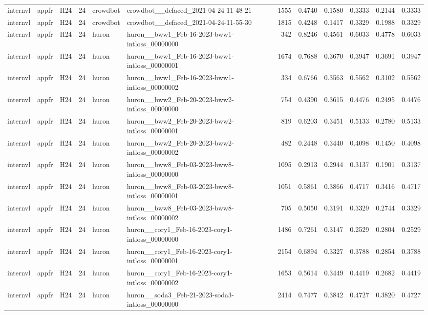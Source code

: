 \begin{table}[tbp]
\begin{tabular}{lllrllrrrrrr}
internvl & appfr & H24 & 24 & crowdbot & crowdbot\_\_defaced\_2021-04-24-11-48-21 & 1555 & 0.4740 & 0.1580 & 0.3333 & 0.2144 & 0.3333 \\
internvl & appfr & H24 & 24 & crowdbot & crowdbot\_\_defaced\_2021-04-24-11-55-30 & 1815 & 0.4248 & 0.1417 & 0.3329 & 0.1988 & 0.3329 \\
internvl & appfr & H24 & 24 & huron & huron\_\_bww1\_Feb-16-2023-bww1-intloss\_00000000 & 342 & 0.8246 & 0.4561 & 0.6033 & 0.4778 & 0.6033 \\
internvl & appfr & H24 & 24 & huron & huron\_\_bww1\_Feb-16-2023-bww1-intloss\_00000001 & 1674 & 0.7688 & 0.3670 & 0.3947 & 0.3691 & 0.3947 \\
internvl & appfr & H24 & 24 & huron & huron\_\_bww1\_Feb-16-2023-bww1-intloss\_00000002 & 334 & 0.6766 & 0.3563 & 0.5562 & 0.3102 & 0.5562 \\
internvl & appfr & H24 & 24 & huron & huron\_\_bww2\_Feb-20-2023-bww2-intloss\_00000000 & 754 & 0.4390 & 0.3615 & 0.4476 & 0.2495 & 0.4476 \\
internvl & appfr & H24 & 24 & huron & huron\_\_bww2\_Feb-20-2023-bww2-intloss\_00000001 & 819 & 0.6203 & 0.3451 & 0.5133 & 0.2780 & 0.5133 \\
internvl & appfr & H24 & 24 & huron & huron\_\_bww2\_Feb-20-2023-bww2-intloss\_00000002 & 482 & 0.2448 & 0.3440 & 0.4098 & 0.1450 & 0.4098 \\
internvl & appfr & H24 & 24 & huron & huron\_\_bww8\_Feb-03-2023-bww8-intloss\_00000000 & 1095 & 0.2913 & 0.2944 & 0.3137 & 0.1901 & 0.3137 \\
internvl & appfr & H24 & 24 & huron & huron\_\_bww8\_Feb-03-2023-bww8-intloss\_00000001 & 1051 & 0.5861 & 0.3866 & 0.4717 & 0.3416 & 0.4717 \\
internvl & appfr & H24 & 24 & huron & huron\_\_bww8\_Feb-03-2023-bww8-intloss\_00000002 & 705 & 0.5050 & 0.3191 & 0.3329 & 0.2744 & 0.3329 \\
internvl & appfr & H24 & 24 & huron & huron\_\_cory1\_Feb-16-2023-cory1-intloss\_00000000 & 1486 & 0.7261 & 0.3147 & 0.2529 & 0.2804 & 0.2529 \\
internvl & appfr & H24 & 24 & huron & huron\_\_cory1\_Feb-16-2023-cory1-intloss\_00000001 & 2154 & 0.6894 & 0.3327 & 0.3788 & 0.2854 & 0.3788 \\
internvl & appfr & H24 & 24 & huron & huron\_\_cory1\_Feb-16-2023-cory1-intloss\_00000002 & 1653 & 0.5614 & 0.3449 & 0.4419 & 0.2682 & 0.4419 \\
internvl & appfr & H24 & 24 & huron & huron\_\_soda3\_Feb-21-2023-soda3-intloss\_00000000 & 2414 & 0.7477 & 0.3842 & 0.4727 & 0.3820 & 0.4727 \\

\end{tabular}
\end{table}
